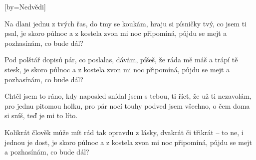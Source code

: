[by={Nedvědi}]

\beginverse{}
Na dlani jednu z tvých řas, do tmy se koukám,
hraju si písničky tvý, co jsem ti psal,
je skoro půlnoc a z kostela zvon mi noc připomíná,
půjdu se mejt a pozhasínám, co bude dál?
\endverse{}

\beginverse{}
Pod polštář dopisů pár, co poslalas, dávám,
píšeš, že ráda mě máš a trápí tě stesk,
je skoro půlnoc a z kostela zvon mi noc připomíná,
půjdu se mejt a pozhasínám, co bude dál?
\endverse{}

\beginchorus{}
Chtěl jsem to ráno, kdy naposled snídal jsem s tebou,
ti říct, že už ti nezavolám,
pro jednu pitomou holku, pro pár nocí touhy
podved jsem všechno, o čem doma si sníš,
teď je mi to líto. 
\endchorus{}

\beginverse{}
Kolikrát člověk může mít rád tak opravdu z lásky,
dvakrát či třikrát -- to ne, i jednou je dost,
je skoro půlnoc a z kostela zvon mi noc připomíná,
půjdu se mejt a pozhasínám, co bude dál?
\endverse{}

\beginchorus{}


\endchorus{}

\endsong{}
